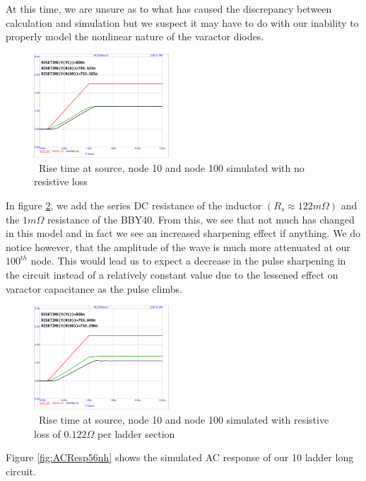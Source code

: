 \documentclass[journal]{IEEEtran}
\begin{document}
At this time, we are unsure as to what has caused the discrepancy between calculation and simulation but we suspect it may have to do with our inability to properly model the nonlinear nature of the varactor diodes. 

\begin{figure}[htb]
\centering
\includegraphics[width=0.45\textwidth,page = 1]{risetimeGuessNOLoss.pdf}
\caption{\ Rise time at source, node 10 and node 100 simulated with no resistive loss
}\label{fig:riseNoLoss}
\end{figure}

In figure \ref{fig:riseWithLoss}, we add the series DC resistance of the inductor $(R_s \approx 122m\Omega)$ and the $1m\Omega$ resistance of the BBY40.  From this, we see that not much has changed in this model and in fact we see an increased sharpening effect if anything. We do notice however, that the amplitude of the wave is much more attenuated at our $100^{th}$ node. This would lead us to expect a decrease in the pulse sharpening in the circuit instead of a relatively constant value due to the lessened effect on varactor capacitance as the pulse climbs.

\begin{figure}[htb]
\centering
\includegraphics[width=0.45\textwidth,page = 1]{risetimeGuessWLoss.pdf}
\caption{\ Rise time at source, node 10 and node 100 simulated with resistive loss of $0.122\Omega$ per ladder section 
}\label{fig:riseWithLoss}
\end{figure}

Figure \ref{fig:ACResp56nh} shows the simulated AC response of our 10 ladder long circuit.
\end{document}
